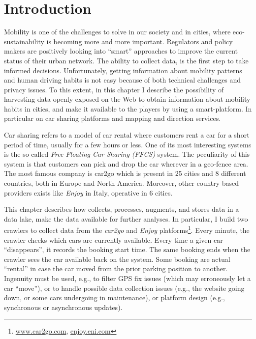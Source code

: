 \section{Introduction}
\label{sec:2_1_intro}

Mobility is one of the challenges to solve in our society and in cities, where eco-sustainability is becoming more and more important. Regulators and policy makers are positively looking into ``smart'' approaches to improve the current status of their urban network.  The ability to collect data, is the first step to take informed decisions. Unfortunately, getting information about mobility patterns and human driving habits is not easy because of both technical challenges and privacy issues.
%
To this extent, in this chapter I describe the possibility of harvesting data openly exposed on the Web to obtain information about mobility habits in cities, and make it available to the players by using a smart-platform. In particular on car sharing platforms and mapping and direction services.

Car sharing refers to a model of car rental where customers rent a car for a short period of time, usually for a few hours or less. One of its most interesting systems is the so called \textit{Free-Floating Car Sharing (FFCS)} system. The peculiarity of this system is that customers can pick and drop the car wherever in a geo-fence area. The most famous company is car2go which is present in 25 cities and 8 different countries, both in Europe and North America. Moreover, other country-based providers exists like \textit{Enjoy} in Italy, operative in 6 cities.

This chapter describes how \tool collects, processes, augments, and stores data in a data lake, make the data available for further analyses. In particular, I build two crawlers to collect data from the \textit{car2go} and \textit{Enjoy} platforms\footnote{\url{www.car2go.com}, \url{enjoy.eni.com}}. Every minute, the crawler checks which cars are currently available. Every time a given car ``disappears'', it records the booking start time. The same booking ends when the crawler sees the car available back on the system. Some booking are actual ``rental'' in case the car moved from the prior parking position to another. Ingenuity must be used, e.g., to filter GPS fix issues (which may erroneously let a car ``move''), or to handle possible data collection issues (e.g., the website going down, or some cars undergoing in maintenance), or platform design (e.g., synchronous or asynchronous updates).

